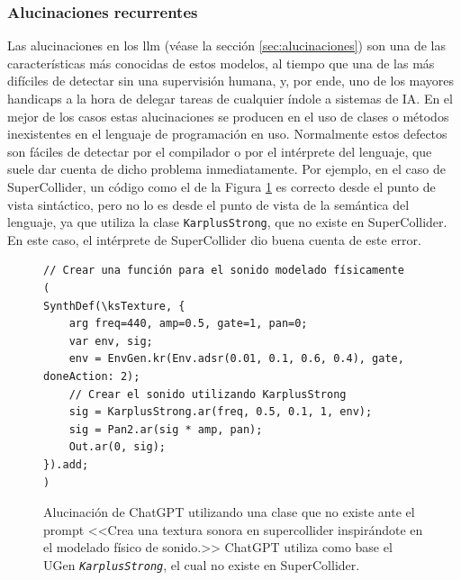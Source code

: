 \subsubsection{Alucinaciones recurrentes}
Las {alucinaciones} en los \gls{llm} (véase la sección \ref{sec:alucinaciones}) son una de las características más conocidas de estos modelos, al tiempo que una de las más difíciles de detectar sin una supervisión humana, y, por ende, uno de los mayores handicaps a la hora de delegar tareas de cualquier índole a sistemas de IA. En el mejor de los casos estas alucinaciones se producen en el uso de clases o métodos inexistentes en el lenguaje de programación en uso. Normalmente estos defectos son fáciles de detectar por el compilador o por el intérprete del lenguaje, que suele dar cuenta de dicho problema inmediatamente. Por ejemplo, en el caso de SuperCollider, un código como el de la Figura \ref{fig:alucinacion_chatgpt} es correcto desde el punto de vista sintáctico, pero no lo es desde el punto de vista de la semántica del lenguaje, ya que utiliza la clase \texttt{KarplusStrong}, que no existe en SuperCollider. En este caso, el intérprete de SuperCollider dio buena cuenta de este error. 

\begin{figure}[H]
    \caption[Alucinación de ChatGPT utilizando una clase que no existe]{Alucinación de ChatGPT utilizando una clase que no existe ante el prompt <<Crea una textura sonora en supercollider inspirándote en el modelado físico de sonido.>> ChatGPT utiliza como base el UGen \emph{\texttt{KarplusStrong}}, el cual no existe en SuperCollider.}
    \centering
    \begin{lstlisting}[style=SuperCollider-IDE, basicstyle=\footnotesize\ttfamily, numbers=none]
// Crear una función para el sonido modelado físicamente
(
SynthDef(\ksTexture, {
    arg freq=440, amp=0.5, gate=1, pan=0;
    var env, sig;
    env = EnvGen.kr(Env.adsr(0.01, 0.1, 0.6, 0.4), gate, doneAction: 2);
    // Crear el sonido utilizando KarplusStrong
    sig = KarplusStrong.ar(freq, 0.5, 0.1, 1, env);
    sig = Pan2.ar(sig * amp, pan);
    Out.ar(0, sig);
}).add;
)
    \end{lstlisting}
    \source{\propio}
    \label{fig:alucinacion_chatgpt}
\end{figure}


